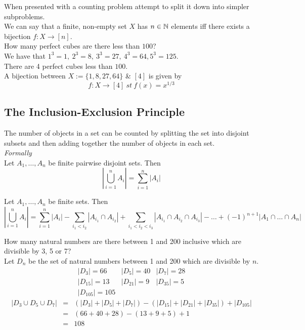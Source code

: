 \documentclass[11pt,a4paper]{article}
\begin{document}
When presented with a counting problem attempt to split it down into simpler subproblems.\\

We can say that a finite, non-empty set $X$ has $n\in\mathbb{N}$ elements iff there exists a bijection $f:X\to[n]$.\\

How many perfect cubes are there less than $100$?\\
We have that $1^3=1,\ 2^3=8,\ 3^3=27,\ 4^3=64, 5^3=125$.\\
There are 4 perfect cubes less than $100$.\\
A bijection between $X:=\{1,8,27,64\}$ \& $[4]$ is given by $$f:X\to[4]\ st\ f(x)=x^{1/3}$$

\subsection{The Inclusion-Exclusion Principle}

The number of objects in a set can be counted by splitting the set into disjoint subsets and then adding together the number of objects in each set.\\
\textit{Formally}\\
Let $A_1,\dots,A_n$ be finite pairwise disjoint sets. Then
$$\left|\bigcup\limits_{i=1}^nA_i\right|=\sum_{i=1}^n|A_i|$$

Let $A_1,\dots,A_n$ be finite sets. Then
$$\left|\bigcup\limits_{i=1}^nA_i\right|=\sum_{i=1}^n|A_i|-\sum_{i_1<i_2}|A_{i_1}\cap A_{i_2}|+\sum_{i_1<i_2<i_3}|A_{i_1}\cap A_{i_2}\cap A_{i_3}|-\dots+(-1)^{n+1}|A_1\cap\dots\cap A_n|$$

How many natural numbers are there between 1 and 200 inclusive which are divisible by 3, 5 or 7?\\
Let $D_n$ be the set of natural numbers between 1 and 200 which are divisible by $n$.
\[\begin{array}{lll}
|D_3|=66&|D_5|=40&|D_7|=28\\
|D_{15}|=13&|D_{21}|=9&|D_{35}|=5\\
|D_{105}|=105
\end{array}\]
\[\begin{array}{rcl}
|D_3\cup D_5\cup D_7|&=&(|D_3|+|D_5|+|D_7|)-(|D_{15}|+|D_{21}|+|D_{35}|)+|D_{105}|\\
&=&(66+40+28)-(13+9+5)+1\\
&=&108
\end{array}\]
\end{document}
